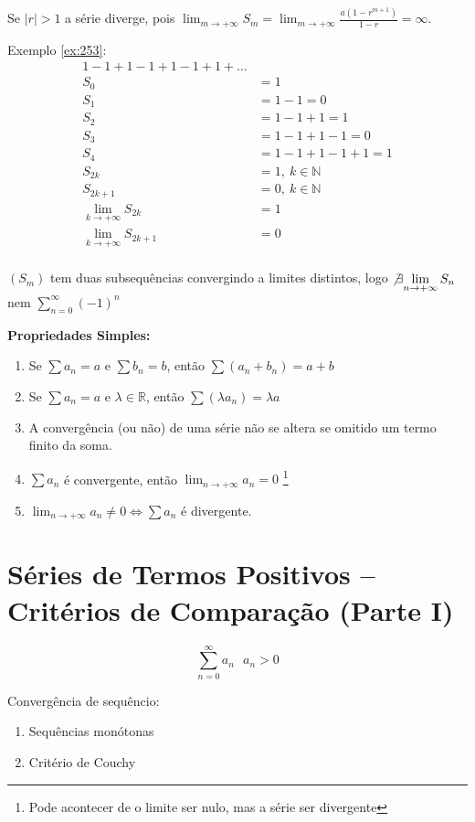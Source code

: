 \documentclass[12pt,openany, letterpaper]{book}
\begin{document}
Se $|r| > 1$ a série diverge, pois $\displaystyle{\lim_{m \rightarrow +\infty} S_m = \lim_{m \rightarrow +\infty} \frac{a(1-r^{m+1})}{1-r} = \infty}$.

Exemplo \ref{ex:253}: 
\begin{align*} 
1 - 1 + 1 - 1 + 1 - 1 + 1 + \hdots \\
S_0 &= 1 \\
S_1 &= 1 - 1 = 0 \\
S_2 &= 1 - 1 + 1 = 1 \\
S_3 &= 1 - 1 + 1  - 1 = 0 \\
S_4 &= 1 - 1 + 1  - 1 + 1 = 1 \\
S_{2k} &= 1, \ k \in \mathds{N} \\
S_{2k+1} &= 0, \ k \in \mathds{N} \\
\lim_{k \rightarrow +\infty} S_{2k} &= 1 \\
\lim_{k \rightarrow +\infty} S_{2k+1} &= 0 \\
\end{align*}

$(S_m)$  tem duas subsequências convergindo a limites distintos, logo $\not \exists \displaystyle{\lim_{n \rightarrow +\infty} S_{n}}$ nem $\displaystyle{\sum_{n=0}^{\infty} (-1)^n}$

\textbf{Propriedades Simples:}
\begin{enumerate}
\item Se $\sum a_n = a$ e $\sum b_n = b$, então $\sum (a_n+b_n) = a+b$
\item Se $\sum a_n = a$ e $\lambda \in \mathds{R}$, então $\sum (\lambda a_n) = \lambda a$
\item A convergência (ou não) de uma série não se altera se omitido um termo finito da soma.
\item $\displaystyle{\sum a_n}$ é convergente, então $\displaystyle{\lim_{n \rightarrow +\infty} a_n = 0}$ \footnote{Pode acontecer de o limite ser nulo, mas a série ser divergente}
\item $\displaystyle{\lim_{n \rightarrow +\infty} a_n \neq 0 \Longleftrightarrow \sum a_n}$ é divergente.
\end{enumerate}

\section{Séries de Termos Positivos -- Critérios de Comparação (Parte I)}
\label{sec:s26}
$$\sum_{n=0}^{\infty} a_n \ \ \ a_n > 0 $$

Convergência de sequêncio:
\begin{enumerate}
\item Sequências monótonas \label{261}
\item Critério de Couchy \label{262}
\end{enumerate}
\end{document}
